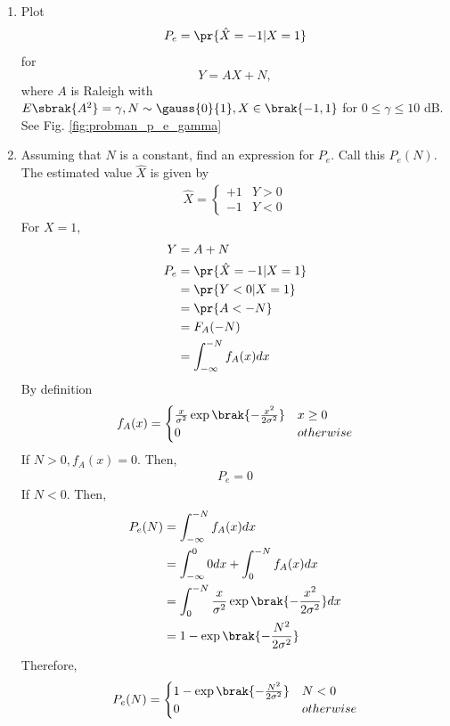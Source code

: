 \begin{enumerate}[label=\thesection.\arabic*.,ref=\thesection.\theenumi]
\item
\label{ch4_sim}
Plot 
\begin{equation}
P_e = \pr{\hat{X} = -1|X=1}
\end{equation}
%
for 
\begin{equation}
Y = AX+N,
\end{equation}
where $A$ is Raleigh with $E\sbrak{A^2} = \gamma, N \sim \gauss{0}{1}, X \in \brak{-1,1}$ for $0 \le \gamma \le 10$ dB.
\\
\solution See Fig. \ref{fig:probman_p_e_gamma}

%
\item
Assuming that $N$ is a constant, find an expression for $P_e$.  Call this $P_e(N)$.
\\
\solution The estimated value $\hat{X}$ is given by
\begin{align}
\hat{X} = 
\begin{cases}
+1 & Y>0\\
-1 & Y<0
\end{cases}
\end{align}
For $X = 1$, 
\begin{align}
Y &= A + N\\
P_e &= \pr{\hat{X} = -1|X=1} \\
&= \pr{Y<0 |X=1}\\
&= \pr{A<-N}\\
&= F_A(-N)\\
&= \int_{-\infty}^{-N} f_A(x)dx
\end{align}
By definition
\begin{align}
f_A(x) = 
\begin{cases}
\frac{x}{\sigma^2}\exp\brak{{-\frac{x^2}{2\sigma^2}}} & x\geq0\\
0 & otherwise
\end{cases}
\end{align}
If $N>0, f_A(x) = 0$. Then,
\begin{align}
 P_e=0  
\end{align}
If $N<0$. Then,
\begin{align}
 P_e(N) &=\int_{-\infty}^{-N} f_A(x)dx\\
 &=\int_{-\infty}^{0} 0dx+\int_{0}^{-N} f_A(x)dx\\
 &=\int_{0}^{-N} \frac{x}{\sigma^2}\exp\brak{{-\frac{x^2}{2\sigma^2}}}dx\\
 &=1-\exp{\brak{-\frac{N^2}{2\sigma^2}}}
\end{align}
Therefore,
\begin{align}\label{pe(N)}
P_e(N) = 
\begin{cases}
1-\exp\brak{{-\frac{N^2}{2\sigma^2}}} & N<0\\
0 & otherwise
\end{cases}
\end{align}
%


\end{enumerate}
